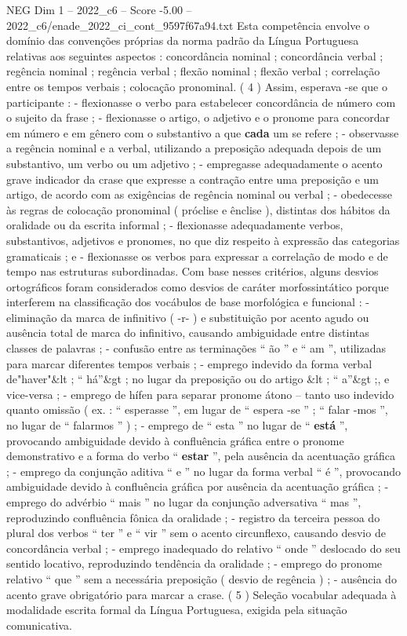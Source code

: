\begin{textsample}{NEG Dim 1 – 2022\_c6 – Score -5.00 – 2022\_c6/enade\_2022\_ci\_cont\_9597f67a94.txt}
Esta competência envolve o domínio das convenções próprias da norma padrão da Língua Portuguesa relativas aos seguintes aspectos : concordância nominal ; concordância verbal ; regência nominal ; regência verbal ; flexão nominal ; flexão verbal ; correlação entre os tempos verbais ; colocação pronominal. ( 4 ) Assim, esperava -se que o participante : - flexionasse o verbo para estabelecer concordância de número com o sujeito da frase ; - flexionasse o artigo, o adjetivo e o pronome para concordar em número e em gênero com o substantivo a que \textbf{cada} um se refere ; - observasse a regência nominal e a verbal, utilizando a preposição adequada depois de um substantivo, um verbo ou um adjetivo ; - empregasse adequadamente o acento grave indicador da crase que expresse a contração entre uma preposição e um artigo, de acordo com as exigências de regência nominal ou verbal ; - obedecesse às regras de colocação pronominal ( próclise e ênclise ), distintas dos hábitos da oralidade ou da escrita informal ; - flexionasse adequadamente verbos, substantivos, adjetivos e pronomes, no que diz respeito à expressão das categorias gramaticais ; e - flexionasse os verbos para expressar a correlação de modo e de tempo nas estruturas subordinadas.
Com base nesses critérios, alguns desvios ortográficos foram considerados como desvios de caráter morfossintático porque interferem na classificação dos vocábulos de base morfológica e funcional : - eliminação da marca de infinitivo ( -r- ) e substituição por acento agudo ou ausência total de marca do infinitivo, causando ambiguidade entre distintas classes de palavras ; - confusão entre as terminações “ ão ” e “ am ”, utilizadas para marcar diferentes tempos verbais ; - emprego indevido da forma verbal de"haver"\&lt ; “ há”\&gt ; no lugar da preposição ou do artigo \&lt ; “ a”\&gt ;, e vice-versa ; - emprego de hífen para separar pronome átono – tanto uso indevido quanto omissão ( ex. : “ esperasse ”, em lugar de “ espera -se ” ; “ falar -mos ”, no lugar de “ falarmos ” ) ; - emprego de “ esta ” no lugar de “ \textbf{está} ”, provocando ambiguidade devido à confluência gráfica entre o pronome demonstrativo e a forma do verbo “ \textbf{estar} ”, pela ausência da acentuação gráfica ; - emprego da conjunção aditiva “ e ” no lugar da forma verbal “ é ”, provocando ambiguidade devido à confluência gráfica por ausência da acentuação gráfica ; - emprego do advérbio “ mais ” no lugar da conjunção adversativa “ mas ”, reproduzindo confluência fônica da oralidade ; - registro da terceira pessoa do plural dos verbos “ ter ” e “ vir ” sem o acento circunflexo, causando desvio de concordância verbal ; - emprego inadequado do relativo “ onde ” deslocado do seu sentido locativo, reproduzindo tendência da oralidade ; - emprego do pronome relativo “ que ” sem a necessária preposição ( desvio de regência ) ; - ausência do acento grave obrigatório para marcar a crase. ( 5 ) Seleção vocabular adequada à modalidade escrita formal da Língua Portuguesa, exigida pela situação comunicativa.

\end{textsample}
